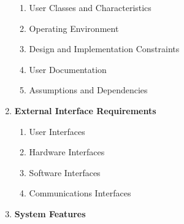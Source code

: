 \documentclass[12pt]{article}
\renewcommand{\_}{\kern-1.5pt\textunderscore\kern-1.5pt}
\begin{document}
\begin{enumerate}
\begin{enumerate}
	\item {\fontsize{13pt}{15.6pt}\selectfont User Classes and Characteristics\par}\par

	\item {\fontsize{13pt}{15.6pt}\selectfont Operating Environment\par}\par

	\item {\fontsize{13pt}{15.6pt}\selectfont Design and Implementation Constraints\par}\par

	\item {\fontsize{13pt}{15.6pt}\selectfont User Documentation\par}\par

	\item {\fontsize{13pt}{15.6pt}\selectfont Assumptions and Dependencies\par}\par


\end{enumerate}
	\item {\fontsize{13pt}{15.6pt}\selectfont \textbf{ External Interface Requirements}\par}\par

\begin{enumerate}
	\item {\fontsize{13pt}{15.6pt}\selectfont User Interfaces\par}\par

	\item {\fontsize{13pt}{15.6pt}\selectfont Hardware Interfaces\par}\par

	\item {\fontsize{13pt}{15.6pt}\selectfont Software Interfaces\par}\par

	\item {\fontsize{13pt}{15.6pt}\selectfont Communications Interfaces\par}\par


\end{enumerate}
	\item {\fontsize{13pt}{15.6pt}\selectfont \textbf{System Features}\par}\par


\end{enumerate}
\end{document}

